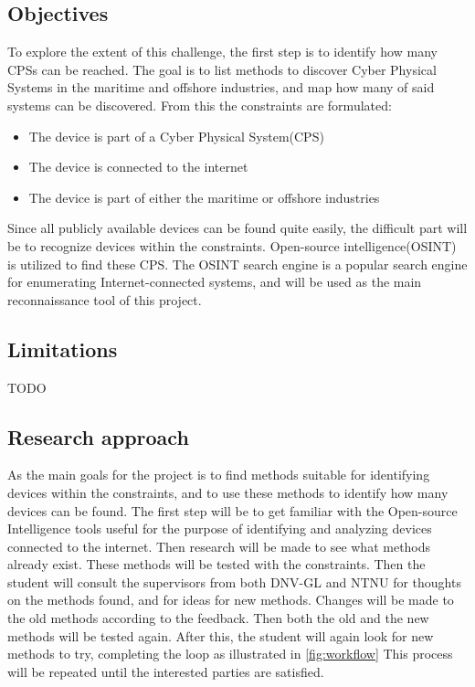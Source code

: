 \subsection{Objectives}
To explore the extent of this challenge, the first step is to identify how many CPSs can be reached. The goal is to list methods to discover Cyber Physical Systems in the maritime and offshore industries, and map how many of said systems can be discovered. From this the constraints are formulated:
\begin{itemize}
    \item The device is part of a Cyber Physical System(CPS)
    \item The device is connected to the internet
    \item The device is part of either the maritime or offshore industries
\end{itemize}
Since all publicly available devices can be found quite easily, the difficult part will be to recognize devices within the constraints.
Open-source intelligence(OSINT) is utilized to find these CPS. The OSINT search engine \href{https://shodan.io}{\color{blue}{Shodan}} is a popular search engine for enumerating Internet-connected systems, and will be used as the main reconnaissance tool of this project. 

\subsection{Limitations}
TODO

\subsection{Research approach}
As the main goals for the project is to find methods suitable for identifying devices within the constraints, and to use these methods to identify how many devices can be found. The first step will be to get familiar with the Open-source Intelligence tools useful for the purpose of identifying and analyzing devices connected to the internet. Then research will be made to see what methods already exist. These methods will be tested with the constraints. Then the student will consult the supervisors from both DNV-GL and NTNU for thoughts on the methods found, and for ideas for new methods. Changes will be made to the old methods according to the feedback. Then both the old and the new methods will be tested again. After this, the student will again look for new methods to try, completing the loop as illustrated in \cref{fig:workflow} This process will be repeated until the interested parties are satisfied.


